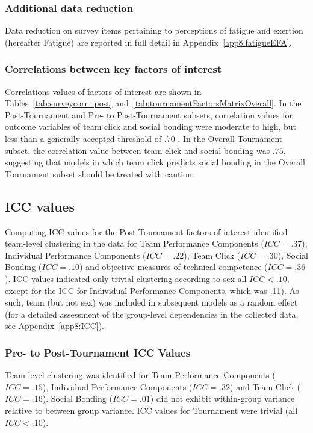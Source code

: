 \begin{CJK}{UTF8}{gbsn}
\subsubsection{Additional data reduction}
Data reduction on survey items pertaining to perceptions of fatigue and exertion (hereafter Fatigue) are reported in full detail in Appendix~\ref{app8:fatigueEFA}.


\subsubsection{Correlations between key factors of interest}
Correlations values of factors of interest are shown in Tables~\ref{tab:surveycorr_post} and~\ref{tab:tournamentFactorsMatrixOverall}.  In the Post-Tournament and Pre- to Post-Tournament subsets, correlation values for outcome variables of team click and social bonding were moderate to high, but less than a generally accepted threshold of .70 \citep{Field2012}.  In the Overall Tournament subset, the correlation value between team click and social bonding was $.75$, suggesting that models in which team click predicts social bonding in the Overall Tournament subset should be treated with caution.








\subsection{ICC values}

Computing ICC values for the Post-Tournament factors of interest identified team-level clustering in the data for Team Performance Components ($ICC = .37$), Individual Performance Components ($ICC = .22$), Team Click ($ICC = .30$), Social Bonding ($ICC = .10$) and objective measures of technical competence ($ICC = .36$).  ICC values indicated only trivial clustering according to sex all $ICC < .10$, except for the ICC for Individual Performance Components, which was .11).  As such, team (but not sex) was included in subsequent models as a random effect (for a detailed assessment of the group-level dependencies in the collected data, see Appendix~\ref{app8:ICC}).


\subsubsection{Pre- to Post-Tournament ICC Values}
Team-level clustering was identified for
Team Performance Components ($ICC = .15$), Individual Performance Components ($ICC = .32$) and Team Click ($ICC = .16$).  Social Bonding ($ICC = .01$) did not exhibit within-group variance relative to between group variance. ICC values for Tournament were trivial (all $ICC < .10$).


\end{CJK}
